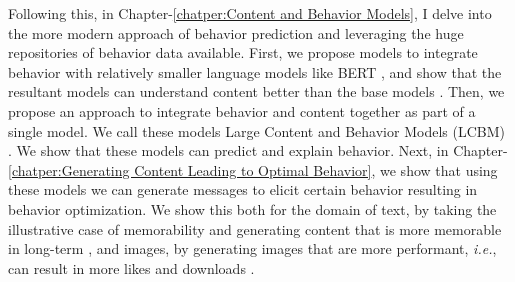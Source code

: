 \documentclass[hidelinks,11pt,a4paper]{report}
\renewcommand{\cite}[1]{\citep{#1}}
\begin{document}
Following this, in Chapter-\ref{chatper:Content and Behavior Models}, I delve into the more modern approach of behavior prediction and leveraging the huge repositories of behavior data available. First, we propose models to integrate behavior with relatively smaller language models like BERT \cite{devlin2018bert}, and show that the resultant models can understand content better than the base models \cite{khurana-etal-2023-synthesizing}. Then, we propose an approach to integrate behavior and content together as part of a single model. We call these models Large Content and Behavior Models (LCBM) \cite{khandelwal2023large}. We show that these models can predict and explain behavior. Next, in Chapter-\ref{chatper:Generating Content Leading to Optimal Behavior}, we show that using these models we can generate messages to elicit certain behavior resulting in behavior optimization. We show this both for the domain of text, by taking the illustrative case of memorability and generating content that is more memorable in long-term \cite{si2023long}, and images, by generating images that are more performant, \textit{i.e.}, can result in more likes and downloads \cite{khurana2023behavior}.

\end{document}
